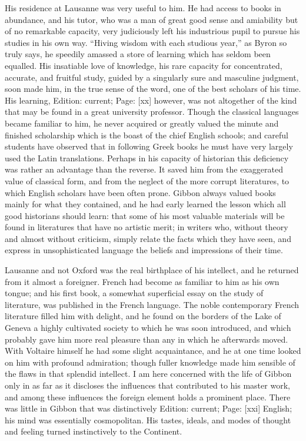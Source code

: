 His residence at Lausanne was very useful to him. He had access to books in abundance, and his tutor, who was a man of great good sense and amiability but of no remarkable capacity, very judiciously left his industrious pupil to pursue his studies in his own way. \texthebrew{“}Hiving wisdom with each studious year,\texthebrew{}” as Byron so truly says, he speedily amassed a store of learning which has seldom been equalled. His insatiable love of knowledge, his rare capacity for concentrated, accurate, and fruitful study, guided by a singularly sure and masculine judgment, soon made him, in the true sense of the word, one of the best scholars of his time. His learning, Edition: current; Page: [xx] however, was not altogether of the kind that may be found in a great university professor. Though the classical languages became familiar to him, he never acquired or greatly valued the minute and finished scholarship which is the boast of the chief English schools; and careful students have observed that in following Greek books he must have very largely used the Latin translations. Perhaps in his capacity of historian this deficiency was rather an advantage than the reverse. It saved him from the exaggerated value of classical form, and from the neglect of the more corrupt literatures, to which English scholars have been often prone. Gibbon always valued books mainly for what they contained, and he had early learned the lesson which all good historians should learn: that some of his most valuable materials will be found in literatures that have no artistic merit; in writers who, without theory and almost without criticism, simply relate the facts which they have seen, and express in unsophisticated language the beliefs and impressions of their time.

Lausanne and not Oxford was the real birthplace of his intellect, and he returned from it almost a foreigner. French had become as familiar to him as his own tongue; and his first book, a somewhat superficial essay on the study of literature, was published in the French language. The noble contemporary French literature filled him with delight, and he found on the borders of the Lake of Geneva a highly cultivated society to which he was soon introduced, and which probably gave him more real pleasure than any in which he afterwards moved. With Voltaire himself he had some slight acquaintance, and he at one time looked on him with profound admiration; though fuller knowledge made him sensible of the flaws in that splendid intellect. I am here concerned with the life of Gibbon only in as far as it discloses the influences that contributed to his master work, and among these influences the foreign element holds a prominent place. There was little in Gibbon that was distinctively Edition: current; Page: [xxi] English; his mind was essentially cosmopolitan. His tastes, ideals, and modes of thought and feeling turned instinctively to the Continent.

